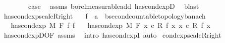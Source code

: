 \begin{isabellebody}
\isanewline
\ \ \isamarkupfalse%
\ {}\isanewline
\ \ \isamarkupfalse%
\ {\isacharquery}{\kern0pt}case\ \isamarkupfalse%
\ assms\ borel{\isacharunderscore}{\kern0pt}measurable{\isacharunderscore}{\kern0pt}add\ has{\isacharunderscore}{\kern0pt}cond{\isacharunderscore}{\kern0pt}expD{\isacharparenleft}{\kern0pt}{}{\isacharparenright}{\kern0pt}\ \isamarkupfalse%
\ blast\isanewline
{}\isamarkupfalse%
%
\endisatagproof
{\isafoldproof}%
%
\isadelimproof
\isanewline
%
\endisadelimproof
\isanewline
{}\isamarkupfalse%
\ has{\isacharunderscore}{\kern0pt}cond{\isacharunderscore}{\kern0pt}exp{\isacharunderscore}{\kern0pt}scaleR{\isacharunderscore}{\kern0pt}right{\isacharcolon}{\kern0pt}\isanewline
\ \ \ f\ {\isacharcolon}{\kern0pt}{\isacharcolon}{\kern0pt}\ {\isachardoublequoteopen}{\isacharprime}{\kern0pt}a\ {\isasymRightarrow}\ {\isacharprime}{\kern0pt}b{\isacharcolon}{\kern0pt}{\isacharcolon}{\kern0pt}{\isacharbraceleft}{\kern0pt}second{\isacharunderscore}{\kern0pt}countable{\isacharunderscore}{\kern0pt}topology{\isacharcomma}{\kern0pt}banach{\isacharbraceright}{\kern0pt}{\isachardoublequoteclose}\isanewline
\ \ \ {\isachardoublequoteopen}has{\isacharunderscore}{\kern0pt}cond{\isacharunderscore}{\kern0pt}exp\ M\ F\ f\ f{\isacharprime}{\kern0pt}{\isachardoublequoteclose}\isanewline
\ \ \ {\isachardoublequoteopen}has{\isacharunderscore}{\kern0pt}cond{\isacharunderscore}{\kern0pt}exp\ M\ F\ {\isacharparenleft}{\kern0pt}{\isasymlambda}x{\isachardot}{\kern0pt}\ c\ {\isacharasterisk}{\kern0pt}\isactrlsub R\ f\ x{\isacharparenright}{\kern0pt}\ {\isacharparenleft}{\kern0pt}{\isasymlambda}x{\isachardot}{\kern0pt}\ c\ {\isacharasterisk}{\kern0pt}\isactrlsub R\ f{\isacharprime}{\kern0pt}\ x{\isacharparenright}{\kern0pt}{\isachardoublequoteclose}\isanewline
%
\isadelimproof
\ \ %
\endisadelimproof
%
\isatagproof
{}\isamarkupfalse%
\ has{\isacharunderscore}{\kern0pt}cond{\isacharunderscore}{\kern0pt}expD{\isacharbrackleft}{\kern0pt}OF\ assms{\isacharbrackright}{\kern0pt}\ \isamarkupfalse%
\ {\isacharparenleft}{\kern0pt}intro\ has{\isacharunderscore}{\kern0pt}cond{\isacharunderscore}{\kern0pt}expI{\isacharprime}{\kern0pt}{\isacharcomma}{\kern0pt}\ auto{\isacharparenright}{\kern0pt}%
\endisatagproof
{\isafoldproof}%
%
\isadelimproof
\isanewline
%
\endisadelimproof
\isanewline
{}\isamarkupfalse%
\ cond{\isacharunderscore}{\kern0pt}exp{\isacharunderscore}{\kern0pt}scaleR{\isacharunderscore}{\kern0pt}right{\isacharcolon}{\kern0pt}\isanewline

\end{isabellebody}
